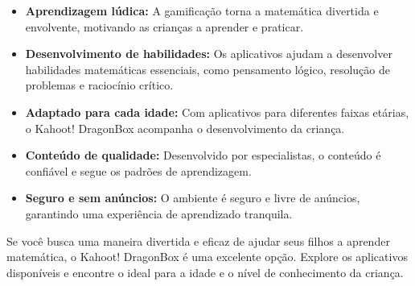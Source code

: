 \begin{itemize}
    \item \textbf{Aprendizagem lúdica:} A gamificação torna a matemática divertida e envolvente, motivando as crianças a aprender e praticar.
    \item \textbf{Desenvolvimento de habilidades:} Os aplicativos ajudam a desenvolver habilidades matemáticas essenciais, como pensamento lógico, resolução de problemas e raciocínio crítico.
    \item \textbf{Adaptado para cada idade:} Com aplicativos para diferentes faixas etárias, o Kahoot! DragonBox acompanha o desenvolvimento da criança.
    \item \textbf{Conteúdo de qualidade:} Desenvolvido por especialistas, o conteúdo é confiável e segue os padrões de aprendizagem.
    \item \textbf{Seguro e sem anúncios:} O ambiente é seguro e livre de anúncios, garantindo uma experiência de aprendizado tranquila.
\end{itemize}

Se você busca uma maneira divertida e eficaz de ajudar seus filhos a aprender matemática, o Kahoot! DragonBox é uma excelente opção. Explore os aplicativos disponíveis e encontre o ideal para a idade e o nível de conhecimento da criança.

